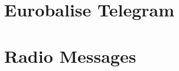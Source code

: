 \documentclass[paper=a4,12pt,DIV16,BCOR8mm,twoside]{scrreprt}
\begin{document}
\chapter{Eurobalise Telegram}
\chapter{Radio Messages}

\cleardoublepage

%
 

%
%
\end{document}
